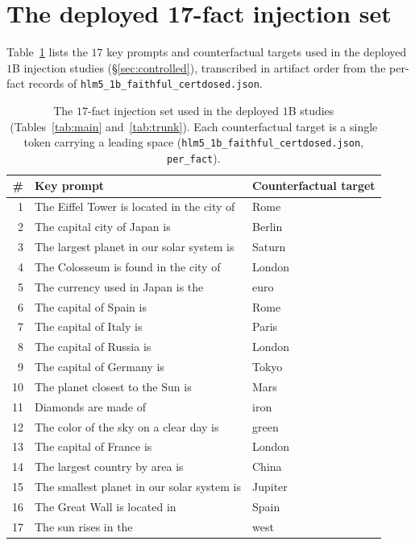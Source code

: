 \documentclass[11pt]{article}
\theoremstyle{remark}
\begin{document}
\section{The deployed 17-fact injection set}

Table~\ref{app:facts} lists the $17$ key prompts and counterfactual targets
used in the deployed $1$B injection studies (\S\ref{sec:controlled}),
transcribed in artifact order from the per-fact records of
\texttt{hlm5\_1b\_\allowbreak faithful\_\allowbreak certdosed.json}.

\begin{table}[t]
\centering\small
\begin{tabular}{r l l}
\toprule
\# & Key prompt & Counterfactual target \\
\midrule
1 & The Eiffel Tower is located in the city of & Rome \\
2 & The capital city of Japan is & Berlin \\
3 & The largest planet in our solar system is & Saturn \\
4 & The Colosseum is found in the city of & London \\
5 & The currency used in Japan is the & euro \\
6 & The capital of Spain is & Rome \\
7 & The capital of Italy is & Paris \\
8 & The capital of Russia is & London \\
9 & The capital of Germany is & Tokyo \\
10 & The planet closest to the Sun is & Mars \\
11 & Diamonds are made of & iron \\
12 & The color of the sky on a clear day is & green \\
13 & The capital of France is & London \\
14 & The largest country by area is & China \\
15 & The smallest planet in our solar system is & Jupiter \\
16 & The Great Wall is located in & Spain \\
17 & The sun rises in the & west \\
\bottomrule
\end{tabular}
\caption{The $17$-fact injection set used in the deployed $1$B studies
(Tables~\ref{tab:main} and~\ref{tab:trunk}). Each counterfactual target is a
single token carrying a leading space
(\texttt{hlm5\_1b\_faithful\_certdosed.json}, \texttt{per\_fact}).}
\label{app:facts}
\end{table}
\end{document}

